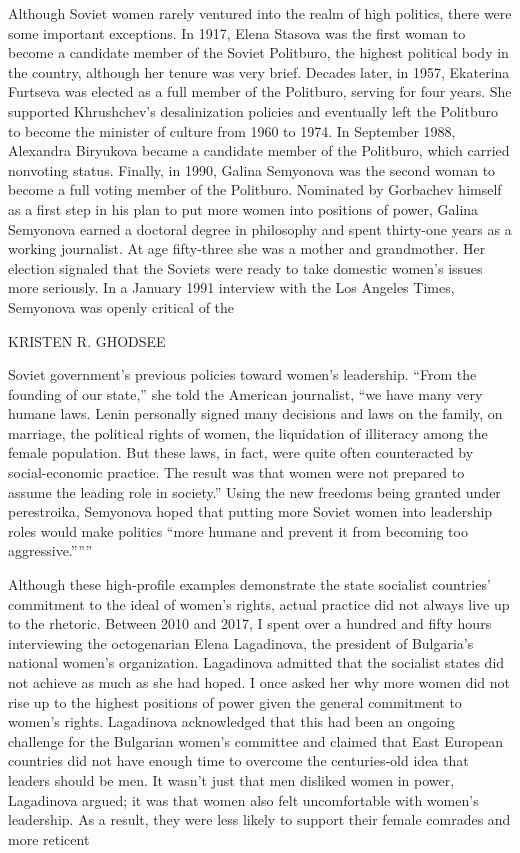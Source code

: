 \par 
Although Soviet women rarely ventured into the realm of high politics, there were some important exceptions. In 1917, Elena Stasova was the first woman to become a candidate member of the Soviet Politburo, the highest political body in the country, although her tenure was very brief. Decades later, in 1957, Ekaterina Furtseva was elected as a full member of the Politburo, serving for four years. She supported Khrushchev’s desalinization policies and eventually left the Politburo to become the minister of culture from 1960 to 1974. In September 1988, Alexandra Biryukova became a candidate member of the Politburo, which carried nonvoting status. Finally, in 1990, Galina Semyonova was the second woman to become a full voting member of the Politburo. Nominated by Gorbachev himself as a first step in his plan to put more women into positions of power, Galina Semyonova earned a doctoral degree in philosophy and spent thirty-one years as a working journalist. At age fifty-three she was a mother and grandmother. Her election signaled that the Soviets were ready to take domestic women’s issues more seriously. In a January 1991 interview with the Los Angeles Times, Semyonova was openly critical of the
 \par 
KRISTEN R. GHODSEE
 \par 
Soviet government's previous policies toward women’s leadership. “From the founding of our state,” she told the American journalist, “we have many very humane laws. Lenin personally signed many decisions and laws on the family, on marriage, the political rights of women, the liquidation of illiteracy among the female population. But these laws, in fact, were quite often counteracted by social-economic practice. The result was that women were not prepared to assume the leading role in society.” Using the new freedoms being granted under perestroika, Semyonova hoped that putting more Soviet women into leadership roles would make politics “more humane and prevent it from becoming too aggressive.”””
 \par 
Although these high-profile examples demonstrate the state socialist countries’ commitment to the ideal of women’s rights, actual practice did not always live up to the rhetoric. Between 2010 and 2017, I spent over a hundred and fifty hours interviewing the octogenarian Elena Lagadinova, the president of Bulgaria’s national women’s organization. Lagadinova admitted that the socialist states did not achieve as much as she had hoped. I once asked her why more women did not rise up to the highest positions of power given the general commitment to women’s rights. Lagadinova acknowledged that this had been an ongoing challenge for the Bulgarian women’s committee and claimed that East European countries did not have enough time to overcome the centuries-old idea that leaders should be men. It wasn’t just that men disliked women in power, Lagadinova argued; it was that women also felt uncomfortable with women’s leadership. As a result, they were less likely to support their female comrades and more reticent
